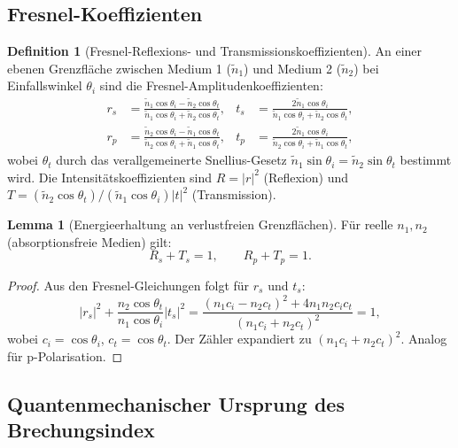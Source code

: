 ﻿\documentclass[a4paper,12pt]{article}
\theoremstyle{definition}
\newtheorem{definition}{Definition}[section]
\newtheorem{lemma}{Lemma}[section]
\begin{document}
	\subsection{Fresnel-Koeffizienten}
	\label{ssec:fresnel}
	
	\begin{definition}[Fresnel-Reflexions- und Transmissionskoeffizienten]
		\label{def:fresnel}
		An einer ebenen Grenzfläche zwischen Medium 1 ($\tilde{n}_1$) und
		Medium 2 ($\tilde{n}_2$) bei Einfallswinkel $\theta_i$ sind die
		Fresnel-Amplitudenkoeffizienten:
		\begin{align}
			r_s &= \frac{\tilde{n}_1 \cos\theta_i - \tilde{n}_2 \cos\theta_t}
			{\tilde{n}_1 \cos\theta_i + \tilde{n}_2 \cos\theta_t},
			& t_s &= \frac{2\tilde{n}_1 \cos\theta_i}
			{\tilde{n}_1 \cos\theta_i + \tilde{n}_2 \cos\theta_t},
			\label{eq:fresnel_s}\\
			r_p &= \frac{\tilde{n}_2 \cos\theta_i - \tilde{n}_1 \cos\theta_t}
			{\tilde{n}_2 \cos\theta_i + \tilde{n}_1 \cos\theta_t},
			& t_p &= \frac{2\tilde{n}_1 \cos\theta_i}
			{\tilde{n}_2 \cos\theta_i + \tilde{n}_1 \cos\theta_t},
			\label{eq:fresnel_p}
		\end{align}
		wobei $\theta_t$ durch das verallgemeinerte Snellius-Gesetz
		$\tilde{n}_1 \sin\theta_i = \tilde{n}_2 \sin\theta_t$ bestimmt wird.
		Die Intensitätskoeffizienten sind $R = |r|^2$ (Reflexion) und
		$T = (\tilde{n}_2 \cos\theta_t)/(\tilde{n}_1 \cos\theta_i)|t|^2$ (Transmission).
	\end{definition}
	
	\begin{lemma}[Energieerhaltung an verlustfreien Grenzflächen]
		\label{lem:energie}
		Für reelle $n_1, n_2$ (absorptionsfreie Medien) gilt:
		\begin{equation}
			R_s + T_s = 1, \qquad R_p + T_p = 1.
		\end{equation}
	\end{lemma}
	
	\begin{proof}
		Aus den Fresnel-Gleichungen folgt für $r_s$ und $t_s$:
		\[
		|r_s|^2 + \frac{n_2 \cos\theta_t}{n_1 \cos\theta_i}|t_s|^2
		= \frac{(n_1 c_i - n_2 c_t)^2 + 4 n_1 n_2 c_i c_t}{(n_1 c_i + n_2 c_t)^2} = 1,
		\]
		wobei $c_i = \cos\theta_i$, $c_t = \cos\theta_t$.
		Der Zähler expandiert zu $(n_1 c_i + n_2 c_t)^2$. Analog für p-Polarisation.
	\end{proof}
	
	\subsection{Quantenmechanischer Ursprung des Brechungsindex}
	\label{ssec:qm-brechung}
	
\end{document}
